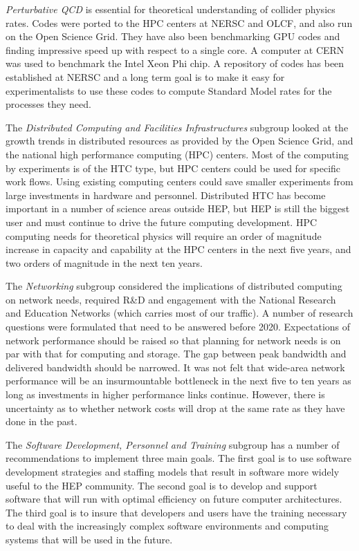 {\it Perturbative QCD} is essential for theoretical understanding of
collider physics rates. Codes were ported to the HPC centers at NERSC and
OLCF, and also run on the Open Science Grid. They have also been
benchmarking GPU codes and finding impressive speed up with respect to
 a single core.
A computer at CERN was used to benchmark the Intel Xeon Phi chip.
A repository of codes has been established at NERSC and a long term goal is
to make it easy for experimentalists to use these codes to compute Standard
Model rates for the processes they need.

The {\it Distributed Computing and Facilities Infrastructures} subgroup
looked at the growth trends in distributed resources as provided by the
Open Science Grid, and the national high performance computing (HPC)
centers. Most of the computing by experiments is of the HTC type, but HPC
centers could be used for specific work flows. Using existing computing
centers could save smaller experiments from large investments in hardware
and personnel. Distributed HTC has become important in a number of science
areas outside HEP, but HEP is still the biggest user and must continue to
drive the future computing development. HPC computing needs for theoretical
physics will require an order of magnitude increase in capacity and
capability at the HPC centers in the next five years, and two orders of
magnitude in the next ten years.

The {\it Networking} subgroup considered the implications of distributed
computing on network needs, required R\&D and engagement with the National
Research and Education Networks (which carries most of our traffic). A
number of research questions were formulated that need to be answered
before 2020. Expectations of network performance should be raised so that
planning for network needs is on par with that for computing and storage.
The gap between peak bandwidth and delivered bandwidth should be narrowed.
It was not felt that wide-area network performance will be an
insurmountable bottleneck in the next five to ten years as long as
investments in higher performance links continue. However, there is
uncertainty as to whether network costs will drop at the same rate as they
have done in the past.

The {\it Software Development, Personnel and Training} subgroup has a
number of recommendations to implement three main goals. The first goal is
to use software development strategies and staffing models that result in
software more widely useful to the HEP community. The second goal is to
develop and support software that will run with optimal efficiency on
future computer architectures. The third goal is to insure that developers
and users have the training necessary to deal with the increasingly complex
software environments and computing systems that will be used in the future.

